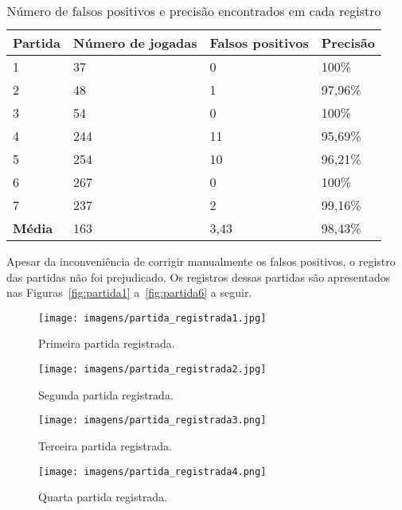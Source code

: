 \begin{table}[tbh]
\centering
\label{tab:falsos-positivos}
\begin{tabular}{l|l|l|l}
\textbf{Partida} & \textbf{Número de jogadas} & \textbf{Falsos positivos} & \textbf{Precisão}\\
\hline
1 &  37 &  0 &   100\%\\    %
\hline
2 &  48 &  1 & 97,96\%\\    %
\hline
3 &  54 &  0 &   100\%\\    %
\hline
4 & 244 & 11 & 95,69\%\\    %
\hline
5 & 254 & 10 & 96,21\%\\    %
\hline
6 & 267 &  0 &   100\%\\    %
\hline
7 & 237 &  2 & 99,16\%\\    %
\hline
\textbf{Média} & 163 & 3,43 & 98,43\%\\
\end{tabular}
\caption{Número de falsos positivos e precisão encontrados em cada registro}
\end{table}

Apesar da inconveniência de corrigir manualmente os falsos positivos, o registro das partidas não foi prejudicado.
Os registros dessas partidas são apresentados nas Figuras~\ref{fig:partida1} a~\ref{fig:partida6} a seguir.

\begin{figure}[htb!]
\centering
\begin{minipage}{.49\textwidth}
  \texttt{[image: imagens/partida\_registrada1.jpg]}
  \centering
  \caption{Primeira partida registrada.}
  \label{fig:partida1}
\end{minipage}
\begin{minipage}{.5\textwidth}
  \texttt{[image: imagens/partida\_registrada2.jpg]}
  \centering
  \caption{Segunda partida registrada.}
  \label{fig:partida2}
\end{minipage}
\end{figure}

\begin{figure}[htb!]
\centering
\begin{minipage}{.49\textwidth}
  \texttt{[image: imagens/partida\_registrada3.png]}
  \centering
  \caption{Terceira partida registrada.}
  \label{fig:partida3}
\end{minipage}
\begin{minipage}{.5\textwidth}
  \texttt{[image: imagens/partida\_registrada4.png]}
  \centering
  \caption{Quarta partida registrada.}
  \label{fig:partida4}
\end{minipage}
\end{figure}

